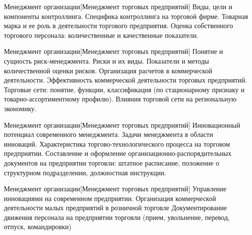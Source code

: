 \documentclass[
	11pt,
	a4paper,
	]
	{article}
\begin{document}
\vfill



\begin{minipage}[t][\miniH]{\miniL}\centering
	 {Менеджмент организации}[Менеджмент торговых предприятий]
		{
			Виды, цели и компоненты контроллинга. Специфика контроллинга на торговой фирме.
		}{
			Товарная марка и ее роль в деятельности торгового предприятия.
		}{
			Оценка собственного торгового персонала: количественные и качественные показатели.
		}
	\lowGE
\end{minipage}

\vfill



\begin{minipage}[t][\miniH]{\miniL}\centering
	 {Менеджмент организации}[Менеджмент торговых предприятий]
		{
			Понятие и сущность риск-менеджмента. Риски и их виды. Показатели и методы количественной оценки рисков.
		}{
			Организация расчетов в коммерческой деятельности. Эффективность коммерческой деятельности торговых предприятий.
		}{
			Торговые сети: понятие, функции, классификация (по стационарному признаку и товарно-ассортиментному профилю). Влияния торговой сети на региональную экономику.
		}
	\lowGE
\end{minipage}





\begin{minipage}[t][\miniH]{\miniL}\centering
	 {Менеджмент организации}[Менеджмент торговых предприятий]
		{
			Инновационный потенциал современного менеджмента. Задачи менеджмента в области инноваций.
		}{
			Характеристика торгово-технологического процесса на торговом предприятии.
		}{
			Составление и оформление организационно-распорядительных документов на предприятии торговли: штатное расписание, положение о структурном подразделении, должностная инструкции.
		}
	\lowGE
\end{minipage}

\vfill



\begin{minipage}[t][\miniH]{\miniL}\centering
	 {Менеджмент организации}[Менеджмент торговых предприятий]
		{
			Управление инновациями на современном предприятии.
		}{
			Организация коммерческой деятельности малых предприятий в розничной торговле
		}{
			Документирование движения персонала на предприятии торговли (прием, увольнение, перевод, отпуск, командировки)
		}
	\lowGE
\end{minipage}
\end{document}
